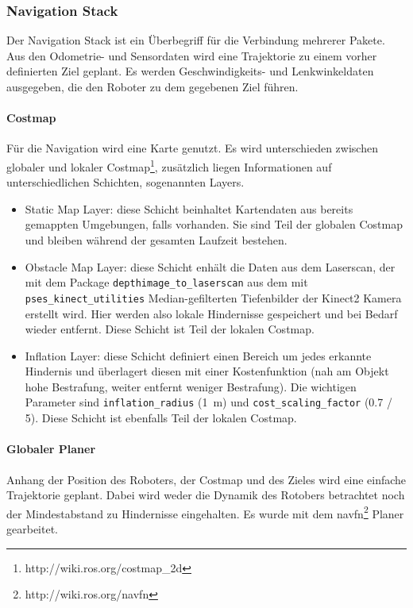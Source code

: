 \subsubsection{Navigation Stack}
\label{subsubsec:02navigatinStack}
Der Navigation Stack ist ein \"Uberbegriff f\"ur die Verbindung mehrerer Pakete. Aus den Odometrie- und Sensordaten wird eine Trajektorie zu einem vorher definierten Ziel geplant. Es werden Geschwindigkeits- und Lenkwinkeldaten ausgegeben, die den Roboter zu dem gegebenen Ziel f\"uhren.
\paragraph{Costmap}
F\"ur die Navigation wird eine Karte genutzt. Es wird unterschieden zwischen globaler und lokaler Costmap\footnote{http://wiki.ros.org/costmap\_2d}, zus\"atzlich liegen Informationen auf unterschiedlichen Schichten, sogenannten Layers.
\begin{itemize}
	\item Static Map Layer: diese Schicht beinhaltet Kartendaten aus bereits gemappten Umgebungen, falls vorhanden. Sie sind Teil der globalen Costmap und bleiben w\"ahrend der gesamten Laufzeit bestehen.
	\item Obstacle Map Layer: diese Schicht enh\"alt die Daten aus dem Laserscan, der mit dem Package \texttt{depthimage\_to\_laserscan} aus dem mit \texttt{pses\_kinect\_utilities} Median-gefilterten Tiefenbilder der Kinect2 Kamera erstellt wird. Hier werden also lokale Hindernisse gespeichert und bei Bedarf wieder entfernt. Diese Schicht ist Teil der lokalen Costmap.
	\item Inflation Layer: diese Schicht definiert einen Bereich um jedes erkannte Hindernis und \"uberlagert diesen mit einer Kostenfunktion (nah am Objekt hohe Bestrafung, weiter entfernt weniger Bestrafung). Die wichtigen Parameter sind \texttt{inflation\_radius} (\SI{1}{\meter}) und \texttt{cost\_scaling\_factor} (0.7 / 5). Diese Schicht ist ebenfalls Teil der lokalen Costmap. 
\end{itemize}

\paragraph{Globaler Planer} 
Anhang der Position des Roboters, der Costmap und des Zieles wird eine einfache Trajektorie geplant. Dabei wird weder die Dynamik des Rotobers betrachtet noch der Mindestabstand zu Hindernisse eingehalten. Es wurde mit dem navfn\footnote{http://wiki.ros.org/navfn} Planer gearbeitet.

